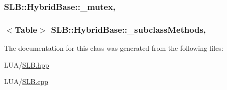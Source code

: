 \subsubsection[{\texorpdfstring{\+\_\+mutex}{_mutex}}]{ S\+L\+B\+::\+Hybrid\+Base\+::\+\_\+mutex\hspace{0.3cm}{\ttfamily [mutable]}, {\ttfamily [protected]}}\hypertarget{classSLB_1_1HybridBase_a276d33834335774a86f6b05bf377c457}{}\label{classSLB_1_1HybridBase_a276d33834335774a86f6b05bf377c457}
\subsubsection[{\texorpdfstring{\+\_\+subclass\+Methods}{_subclassMethods}}]{$<${\bf Table}$>$ S\+L\+B\+::\+Hybrid\+Base\+::\+\_\+subclass\+Methods\hspace{0.3cm}{\ttfamily [mutable]}, {\ttfamily [protected]}}\hypertarget{classSLB_1_1HybridBase_a600895808a766860632acb471dd09f3c}{}\label{classSLB_1_1HybridBase_a600895808a766860632acb471dd09f3c}


The documentation for this class was generated from the following files\+:\begin{DoxyCompactItemize}
\item 
L\+U\+A/\hyperlink{SLB_8hpp}{S\+L\+B.\+hpp}\item 
L\+U\+A/\hyperlink{SLB_8cpp}{S\+L\+B.\+cpp}\end{DoxyCompactItemize}
